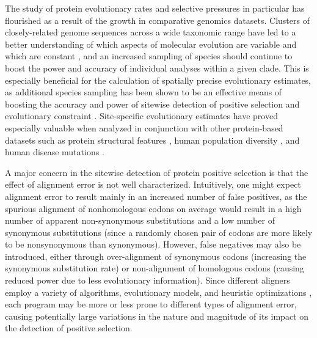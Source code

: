 \documentclass{mbe}
\begin{document}
The study of protein evolutionary rates and selective pressures in
particular has flourished as a result of the growth in comparative
genomics datasets. Clusters of closely-related genome sequences across
a wide taxonomic range have led to a better understanding of which
aspects of molecular evolution are variable and which are constant
\citep{Wolf2009Nonlinear}, and an increased sampling of species should
continue to boost the power and accuracy of individual analyses within
a given clade. This is especially beneficial for the calculation of
spatially precise evolutionary estimates, as additional species
sampling has been shown to be an effective means of boosting the
accuracy and power of sitewise detection of positive selection and
evolutionary constraint
\citep{Anisimova2001Accuracy,Massingham2005Detecting}. Site-specific
evolutionary estimates have proved especially valuable when analyzed
in conjunction with other protein-based datasets such as protein
structural features \citep{Lin2007Proportion,Ramsey2011Relationship},
human population diversity \citep{2010Map}, and human disease
mutations \citep{Arbiza2006Selective}.

A major concern in the sitewise detection of protein positive
selection is that the effect of alignment error is not well
characterized. Intuitively, one might expect alignment error to result
mainly in an increased number of false positives, as the spurious
alignment of nonhomologous codons on average would result in a high
number of apparent non-synonymous substitutions and a low number of
synonymous substitutions (since a randomly chosen pair of codons are
more likely to be nonsynonymous than synonymous). However, false
negatives may also be introduced, either through over-alignment of
synonymous codons (increasing the synonymous substitution rate) or
non-alignment of homologous codons (causing reduced power due to less
evolutionary information). Since different aligners employ a variety
of algorithms, evolutionary models, and heuristic optimizations
\citep{Notredame2007Recent}, each program may be more or less prone to different
types of alignment error, causing potentially large variations in the
nature and magnitude of its impact on the detection of positive
selection.
\end{document}
